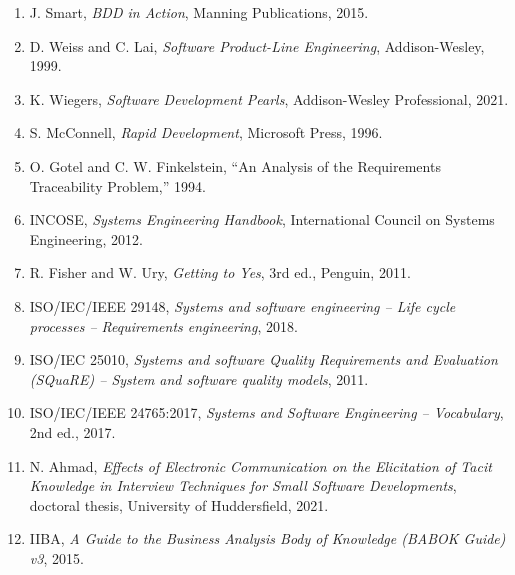 \begin{enumerate}[leftmargin=2.2em,itemsep=.15ex]
\item J. Smart, \textit{BDD in Action}, Manning Publications, 2015.
\item D. Weiss and C. Lai, \textit{Software Product-Line Engineering}, Addison-Wesley, 1999.
\item K. Wiegers, \textit{Software Development Pearls}, Addison-Wesley Professional, 2021.
\item S. McConnell, \textit{Rapid Development}, Microsoft Press, 1996.
\item O. Gotel and C. W. Finkelstein, ``An Analysis of the Requirements Traceability Problem,'' 1994.
\item INCOSE, \textit{Systems Engineering Handbook}, International Council on Systems Engineering, 2012.
\item R. Fisher and W. Ury, \textit{Getting to Yes}, 3rd ed., Penguin, 2011.
\item ISO/IEC/IEEE 29148, \textit{Systems and software engineering -- Life cycle processes -- Requirements engineering}, 2018.
\item ISO/IEC 25010, \textit{Systems and software Quality Requirements and Evaluation (SQuaRE) -- System and software quality models}, 2011.
\item ISO/IEC/IEEE 24765:2017, \textit{Systems and Software Engineering -- Vocabulary}, 2nd ed., 2017.
\item N. Ahmad, \textit{Effects of Electronic Communication on the Elicitation of Tacit Knowledge in Interview Techniques for Small Software Developments}, doctoral thesis, University of Huddersfield, 2021.
\item IIBA, \textit{A Guide to the Business Analysis Body of Knowledge (BABOK Guide) v3}, 2015.
\end{enumerate}
\normalsize
